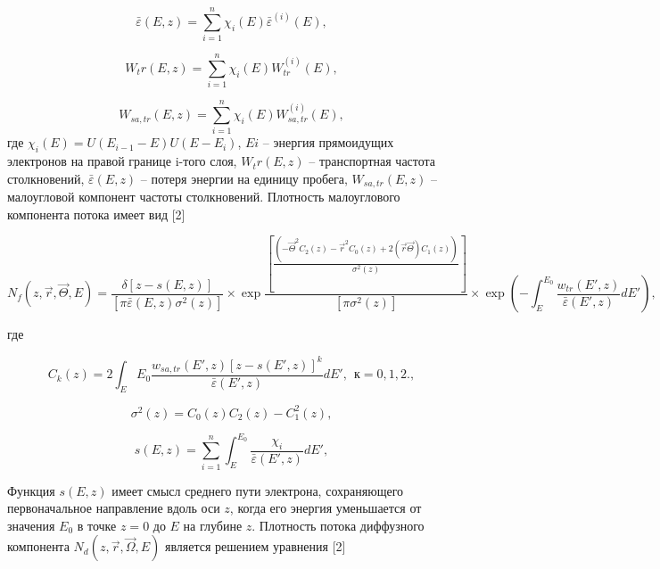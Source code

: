 \begin{equation}
\bar{\varepsilon}(E,z)=\sum_{i=1}^n \chi_i (E)\bar{\varepsilon}^{(i)} (E),
\label{eq:2}
\end{equation}

\begin{equation}
W_tr(E,z)=\sum_{i=1}^n \chi_i (E)W_{tr}^{(i)} (E),
\label{eq:3}
\end{equation}

\begin{equation}
W_{sa,tr}(E,z)=\sum_{i=1}^n \chi_i (E)W_{sa,tr}^{(i)} (E),
\label{eq:4}
\end{equation}
где
$ \chi_i(E)=U(E_{i-1}-E)U(E-E_i) $,
$Ei$ – энергия прямоидущих электронов на правой границе i-того слоя, $W_tr(E,z)$ –
транспортная частота столкновений, $\bar{\varepsilon}(E,z)$ – потеря энергии на единицу пробега, $W_{sa,tr}(E,z)$ – малоугловой компонент частоты столкновений.
Плотность малоуглового компонента потока имеет вид [2]

\begin{equation}
N_f(z,\vec{r},\vec{\Theta},E)=\frac{\delta[z-s(E,z)]}{[\pi \bar{\varepsilon}(E,z)\sigma^2(z)]}\times \exp \frac{[\frac{(-\vec{\Theta}^2 C_2(z)-\vec{r}^2C_0 (z)+2(\vec{r}\vec{\Theta})C_1(z))}{\sigma^2(z)}]}{[\pi\sigma^2(z)]} \times \exp\left(-\int_{E}^{E_0} \frac{w_{tr}(E',z)}{\bar{\varepsilon}(E',z)}dE'\right),
\label{eq:6}
\end{equation}

где

\begin{equation}
C_k(z)=2 \int_{E}{E_0} \frac{w_{sa,tr}(E',z)[z-s(E',z)]^k}{\bar{\varepsilon}(E',z)} dE',\>\> к=0,1,2.,
\label{eq:7}
\end{equation}

\begin{equation}
\sigma^2(z)=C_0(z)C_2(z)-C_1^2(z),
\label{eq:8}
\end{equation}

\begin{equation}
s(E,z)=\sum_{i=1}^{n} \int_{E}^{E_0} \frac{\chi_i}{\bar{\varepsilon}(E',z)} dE',
\label{eq:9}
\end{equation}

Функция $s(E, z)$ имеет смысл среднего пути электрона, сохраняющего первоначальное
направление вдоль оси $z$, когда его энергия уменьшается от значения $E_0$ в точке $z=0$ до $E$
на глубине $z$.
Плотность потока диффузного компонента $N_d(z,\vec{r},\vec{\Omega},E)$ является решением
уравнения [2]

